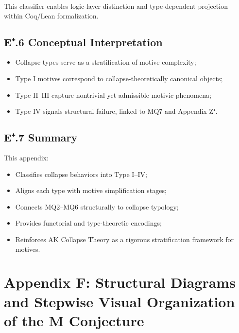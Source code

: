 \documentclass[11pt]{article}
\begin{document}
This classifier enables logic-layer distinction and type-dependent projection within Coq/Lean formalization.

\subsection*{E⁺.6 Conceptual Interpretation}

\begin{itemize}
    \item Collapse types serve as a stratification of motive complexity;
    \item Type I motives correspond to collapse-theoretically canonical objects;
    \item Type II–III capture nontrivial yet admissible motivic phenomena;
    \item Type IV signals structural failure, linked to MQ7 and Appendix Z⁺.
\end{itemize}

\subsection*{E⁺.7 Summary}

This appendix:

\begin{itemize}
    \item Classifies collapse behaviors into Type I–IV;
    \item Aligns each type with motive simplification stages;
    \item Connects MQ2–MQ6 structurally to collapse typology;
    \item Provides functorial and type-theoretic encodings;
    \item Reinforces AK Collapse Theory as a rigorous stratification framework for motives.
\end{itemize}

\FloatBarrier




\section*{Appendix F: Structural Diagrams and Stepwise Visual Organization of the M Conjecture}
\end{document}
